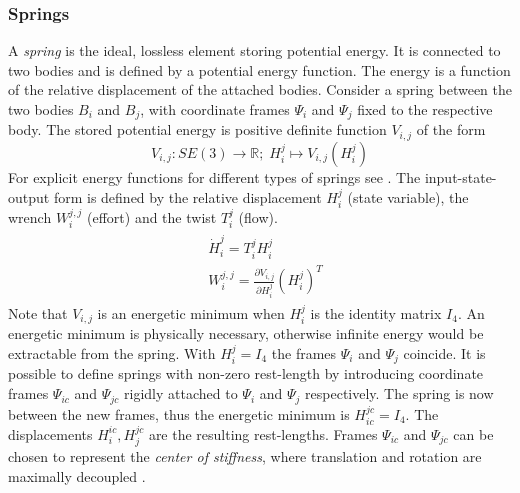 \documentclass[a4paper,twoside, openright,12pt]{report}
\begin{document}
\subsubsection{Springs}
A \emph{spring} is the ideal, lossless element storing potential energy. It is connected to two bodies and is defined by a potential energy function. The energy is a function of the relative displacement of the attached bodies. Consider a spring between the two bodies $ B_i $ and $ B_j $,  with coordinate frames $ \Psi_i $ and $ \Psi_j $ fixed to the respective body. The stored potential energy is positive definite function $V_{i,j}$ of the form 
\begin{equation}\label{EQ:SpringEnergyFunction}
	V_{i,j} : SE(3) \rightarrow \mathbb{R}; \; H_i^j \mapsto V_{i,j}(H_i^j)
\end{equation}
For explicit energy functions for different types of springs see \cite{Stramigioli_01}.
The input-state-output form is defined by the relative displacement $H_i^j$ (state variable), the wrench $W_i^{j,j}$ (effort) and the twist $T_i^j$ (flow).
\begin{eqnarray}
\begin{aligned}
	&\dot{H}_i^j = T_i^{j}H_i^j\\
	&W_i^{j,j} = \frac{\partial V_{i,j}}{\partial H_i^j}(H_i^j)^T
\end{aligned}
\end{eqnarray}
Note that $ V_{i,j} $ is an energetic minimum when $ H_i^j $ is the identity matrix $I_4$. An energetic minimum is physically necessary, otherwise infinite energy would be extractable from the spring. With $ H_i^j = I_4 $ the frames $ \Psi_i $ and $\Psi_j$ coincide.
It is possible to define springs with non-zero rest-length by introducing coordinate frames $ \Psi_{ic} $ and $\Psi_{jc}$ rigidly attached to $ \Psi_i $ and $\Psi_j$ respectively. The spring is now between the new frames, thus the energetic minimum is $H_{ic}^{jc} = I_4$. The displacements $ H_i^{ic}, H_j^{jc} $ are the resulting rest-lengths. Frames $ \Psi_{ic} $ and $\Psi_{jc}$ can be chosen to represent the \emph{center of stiffness}, where translation and rotation are maximally decoupled \cite{Stramigioli_99}.
\end{document}
